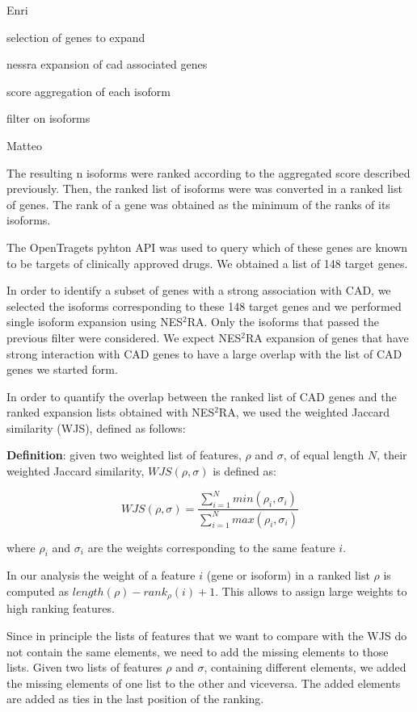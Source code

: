 \documentclass[fleqn,10pt]{SelfArx} %
\begin{document}

Enri

selection of genes to expand

nessra expansion of cad associated genes

score aggregation of each isoform

filter on isoforms

Matteo

The resulting n isoforms were ranked according to the aggregated score described previously. Then, the ranked list of isoforms were was converted in a ranked list of genes. The rank of a gene was obtained as the minimum of the ranks of its isoforms.

The OpenTragets pyhton API was used to query which of these genes are known to be targets of clinically approved drugs. We obtained a list of 148 target genes.

In order to identify a subset of genes with a strong association with CAD, we selected the isoforms corresponding to these 148 target genes and we performed single isoform expansion using NES$^2$RA. Only the isoforms that passed the previous filter were considered. We expect NES$^2$RA expansion of genes that have strong interaction with CAD genes to have a large overlap with the list of CAD genes we started form.

In order to quantify the overlap between the ranked list of CAD genes and the ranked expansion lists obtained with NES$^2$RA, we used the weighted Jaccard similarity (WJS), defined as follows:

\textbf{Definition}: given two weighted list of features, $\rho$ and $\sigma$, of equal length $N$, their weighted Jaccard similarity, $WJS(\rho, \sigma)$ is defined as:

$$
WJS(\rho, \sigma) = \dfrac{\sum_{i=1}^Nmin(\rho_i,\sigma_i)}{\sum_{i=1}^Nmax(\rho_i,\sigma_i)}
$$

where $\rho_i$ and $\sigma_i$ are the weights corresponding to the same feature $i$.

In our analysis the weight of a feature $i$ (gene or isoform) in a ranked list $\rho$ is computed as $length(\rho) - rank_{\rho}(i) + 1$. This allows to assign large weights to high ranking features.

Since in principle the lists of features that we want to compare with the WJS do not contain the same elements, we need to add the missing elements to those lists. Given two lists of features $\rho$ and $\sigma$, containing different elements, we added the missing elements of one list to the other and viceversa. The added elements are added as ties in the last position of the ranking.
\end{document}
